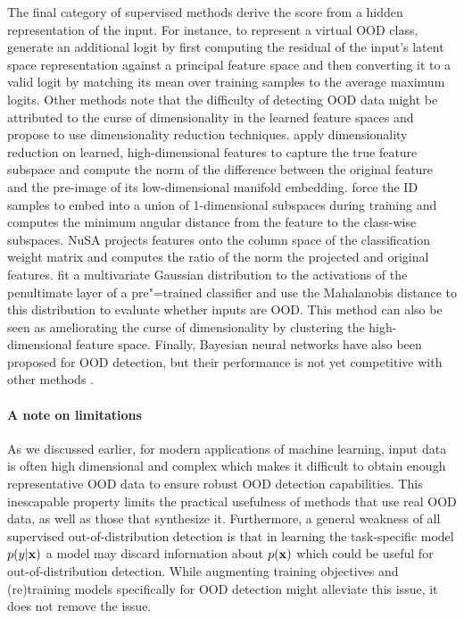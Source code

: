 The final category of supervised methods derive the score from a hidden representation of the input. 
For instance, to represent a virtual OOD class, \textcite{wang_vim_2022} generate an additional logit by first computing the residual of the input's latent space representation against a principal feature space and then converting it to a valid logit by matching its mean over training samples to the average maximum logits. 
Other methods note that the difficulty of detecting OOD data might be attributed to the curse of dimensionality in the learned feature spaces and propose to use dimensionality reduction techniques. \textcite{ndiour_outofdistribution_2020} apply dimensionality reduction on learned, high-dimensional features to capture the true feature subspace and compute the norm of the difference between the original feature and the pre-image of its low-dimensional manifold embedding. 
\textcite{zaeemzadeh_outofdistribution_2021} force the ID samples to embed into a union of 1-dimensional subspaces during training and computes the minimum angular distance from the feature to the class-wise subspaces. 
NuSA \parencite{cook_outlier_2020} projects features onto the column space of the classification weight matrix and computes the ratio of the norm the projected and original features.
\textcite{lee_simple_2018} fit a multivariate Gaussian distribution to the activations of the penultimate layer of a pre"=trained classifier and use the Mahalanobis distance to this distribution to evaluate whether inputs are OOD. This method can also be seen as ameliorating the curse of dimensionality by clustering the high-dimensional feature space. 
Finally, Bayesian neural networks have also been proposed for OOD detection, but their performance is not yet competitive with other methods \parencite{henning_are_2021,dangelo_outofdistribution_2022,nguyen_out_2022}. 


\paragraph{A note on limitations}
As we discussed earlier, for modern applications of machine learning, input data is often high dimensional and complex which makes it difficult to obtain enough representative OOD data to ensure robust OOD detection capabilities. This inescapable property limits the practical usefulness of methods that use real OOD data, as well as those that synthesize it. Furthermore, a general weakness of all supervised out-of-distribution detection is that in learning the task-specific model $p(y|{\mathbf{x}})$ a model may discard information about $p({\mathbf{x}})$ which could be useful for out-of-distribution detection. While augmenting training objectives and (re)training models specifically for OOD detection might alleviate this issue, it does not remove the issue.

